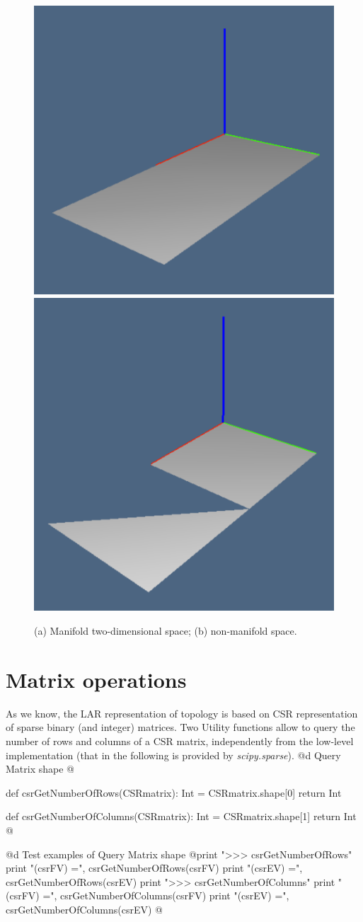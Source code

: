 \documentclass[11pt,oneside]{article}	%
\begin{document}
\begin{figure}[htbp] %
   \centering
   \includegraphics[height=0.25\linewidth,width=0.25\linewidth]{images/2D-non-manifold-a} 
   \includegraphics[height=0.25\linewidth,width=0.25\linewidth]{images/2D-non-manifold-b} 
   \caption{(a) Manifold two-dimensional space; (b) non-manifold space.}
   \label{fig:2D-non-manifold}
\end{figure}

\section{Matrix operations}

As we know, the LAR representation of topology is based on CSR representation of sparse binary (and integer) matrices.
Two Utility functions allow to query the number of rows and columns of a CSR matrix, independently from the low-level implementation (that in the following is provided by \emph{scipy.sparse}).
@d Query Matrix shape
@{def csrGetNumberOfRows(CSRmatrix):
    Int = CSRmatrix.shape[0]
    return Int
    
def csrGetNumberOfColumns(CSRmatrix):
    Int = CSRmatrix.shape[1]
    return Int
@}
@d Test examples of Query Matrix shape
@{print "\n>>> csrGetNumberOfRows"
print "\ncsrGetNumberOfRows(csrFV) =", csrGetNumberOfRows(csrFV)
print "\ncsrGetNumberOfRows(csrEV) =", csrGetNumberOfRows(csrEV)
print "\n>>> csrGetNumberOfColumns"
print "\ncsrGetNumberOfColumns(csrFV) =", csrGetNumberOfColumns(csrFV)
print "\ncsrGetNumberOfColumns(csrEV) =", csrGetNumberOfColumns(csrEV)
@}
\end{document}
